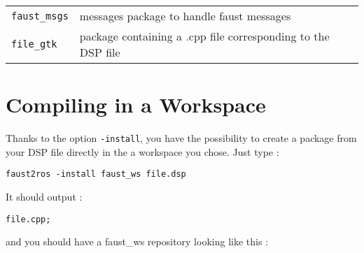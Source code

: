 \begin{tabular}{ll}
	\lstinline'faust_msgs' 		&messages package to handle faust messages\\
	\lstinline'file_gtk'		&package containing a .cpp file corresponding to the DSP file\\
\end{tabular}

\section{Compiling in a Workspace}
Thanks to the option \lstinline'-install', you have the possibility to create a package from your DSP file directly in the a workspace you chose.
Just type :
\begin{lstlisting}
faust2ros -install faust_ws file.dsp
\end{lstlisting}

It should output : 
\begin{lstlisting}
file.cpp; 
\end{lstlisting}
and you should have a faust\_ws repository looking like this :\\


%
